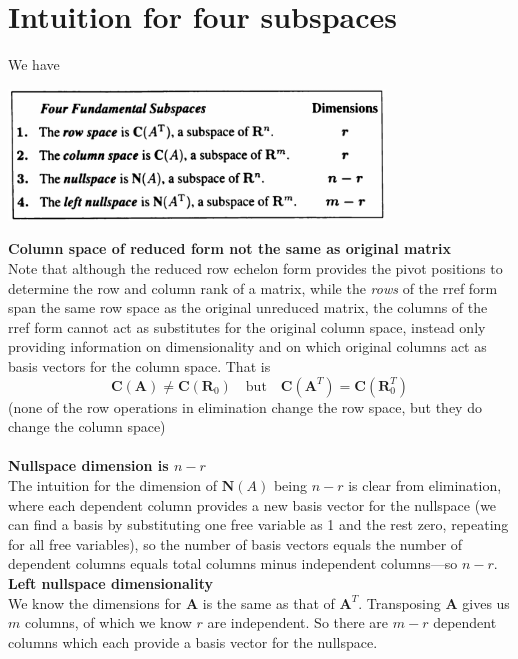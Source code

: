 \documentclass{report}
\begin{document}
\section{Intuition for four subspaces}
We have
\begin{center}
\includegraphics[width=10cm]{45}
\end{center}
\textbf{Column space of reduced form not the same as original matrix}\\
Note that although the reduced row echelon form provides the pivot positions to determine the row and column rank of a matrix, while the \textit{rows} of the rref form 
span the same row space as the original unreduced matrix, the columns of the rref form cannot act as substitutes for the original column space, instead only providing
information on dimensionality and on which original columns act as basis vectors for the column space. That is 
\begin{equation*}
\bm C(\bm A)\neq\bm C(\bm R_0)\quad\text{but}\quad\bm C(\bm A^T)=\bm C(\bm R_0^T)
\end{equation*}
(none of the row operations in elimination change the row space, but they do change the column space)\\
\vspace{1mm}\\
\textbf{Nullspace dimension is $n-r$}\\
The intuition for the dimension of $\bm N(A)$ being $n-r$ is clear from elimination, where each dependent column provides a new basis vector for the nullspace (we can
find a basis by substituting one free variable as 1 and the rest zero, repeating for all free variables), so the number of basis vectors equals the number of
dependent columns equals total columns minus independent columns---so $n-r$.
\vspace{1mm}\\
\textbf{Left nullspace dimensionality}\\
We know the dimensions for $\bm A$ is the same as that of $\bm A^T$. Transposing $\bm A$ gives us $m$ columns, of which we know $r$ are independent. So there are $m-r$ 
dependent columns which each provide a basis vector for the nullspace.
\newpage
\end{document}
